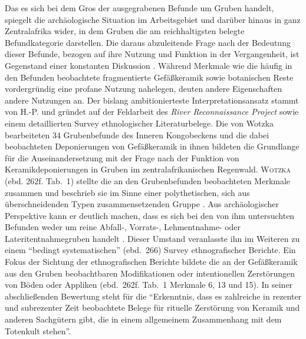 Das es sich bei dem Gros der ausgegrabenen Befunde um Gruben handelt, spiegelt die archäologische Situation im Arbeitsgebiet und darüber hinaus in ganz Zentralafrika wider, in dem Gruben die am reichhaltigsten belegte Befundkategorie darstellen. Die daraus abzuleitende Frage nach der Bedeutung dieser Befunde, bezogen auf ihre Nutzung und Funktion in der Vergangenheit, ist Gegenstand einer konstanten Diskussion \parencite[siehe][197--199]{Meister.2008b}. Während Merkmale wie die häufig in den Befunden beobachtete fragmentierte Gefäßkeramik sowie botanischen Reste vordergründig eine profane Nutzung nahelegen, deuten andere Eigenschaften andere Nutzungen an. Der bislang ambitionierteste Interpretationsansatz stammt von H.-P. \textcite{Wotzka.1993} und gründet auf der Feldarbeit des \textit{River Reconnaissance Project} sowie einem detaillierten Survey ethnologischer Literaturbelege. Die von Wotzka bearbeiteten 34 Grubenbefunde des Inneren Kongobeckens und die dabei beobachteten Deponierungen von Gefäßkeramik in ihnen bildeten die Grundlange für die Auseinandersetzung mit der Frage nach der Funktion von Keramikdeponierungen in Gruben im zentralafrikanischen Regenwald. \textsc{Wotzka} (ebd. 262f. Tab.~1) stellte die an den Grubenbefunden beobachteten Merkmale zusammen und beschrieb sie im Sinne einer polythetischen, sich aus überschneidenden Typen zusammensetzenden Gruppe \parencite[siehe][37f. mit Abb.~3]{Clark.1968}. Aus archäologischer Perspektive kann er deutlich machen, dass es sich bei den von ihm untersuchten Befunden weder um reine \mbox{Abfall-,} Vorrats-, Lehmentnahme- oder Lateritentnahmegruben handelt \parencite[264]{Wotzka.1993}. Dieser Umstand veranlasste ihn im Weiteren zu einem \enquote{bedingt systematischen} (ebd.~266) Survey ethnografischer Berichte. Ein Fokus der Sichtung der ethnografischen Berichte bildete die an der Gefäßkeramik aus den Gruben beobachtbaren Modifikationen oder intentionellen Zerstörungen von Böden oder Appliken (ebd.~262f. Tab.~1 Merkmale 6, 13 und 15). In seiner abschließenden Bewertung steht für \textcite[272]{Wotzka.1993} die \enquote{Erkenntnis, dass es zahlreiche in rezenter und subrezenter Zeit beobachtete Belege für rituelle Zerstörung von Keramik und anderen Sachgütern gibt, die in einem allgemeinem Zusammenhang mit dem Totenkult stehen}.


